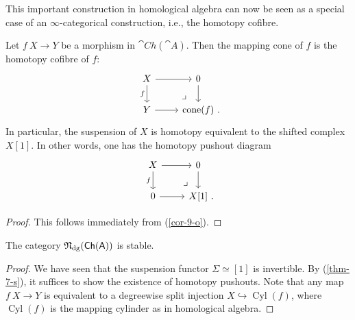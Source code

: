 This important construction in homological algebra
can now be seen as a special case of an $\infty$-categorical construction,
i.e., the homotopy cofibre.

\begin{theorem}
    Let $f\:X\to Y$ be a morphism in $\cat{Ch}(\cat{A})$.
    Then the mapping cone of $f$ is the homotopy cofibre of $f$:
    \[\begin{tikzcd}
        X\ar[r]\ar[d,"f"']\ar[dr,phantom,pos=.75,"\lrcorner",end anchor={[xshift=-.5em]north}] & 0\ar[d] \\
        Y\ar[r] & \operatorname{cone}(f)\rlap{\ .}
    \end{tikzcd}\]
    In particular, the suspension of $X$ is homotopy equivalent to
    the shifted complex $X[1]$.
    In other words, one has the homotopy pushout diagram
    \[\begin{tikzcd}
        X\ar[r]\ar[d,"f"']\ar[dr,phantom,pos=.75,"\lrcorner",end anchor={[xshift=-.5em]north}] & 0\ar[d] \\
        0\ar[r] & X[1]\rlap{\ .}
    \end{tikzcd}\]
\end{theorem}

\begin{proof}
    This follows immediately from (\ref{cor-9-o}).
\end{proof}

\begin{corollary}
    The category $\mathfrak{N}_{\mathrm{dg}}(\mathsf{Ch}(\mathsf{A}))$ is stable.
\end{corollary}

\begin{proof}
    We have seen that the suspension functor $\Sigma\simeq[1]$ is invertible.
    By (\ref{thm-7-s}), it suffices to show the existence of homotopy pushouts.
    Note that any map $f\:X\to Y$ is equivalent to a degreewise split injection 
    $X\hookrightarrow\operatorname{Cyl}(f)$, where $\operatorname{Cyl}(f)$ is the mapping cylinder
    as in homological algebra.
\end{proof}
